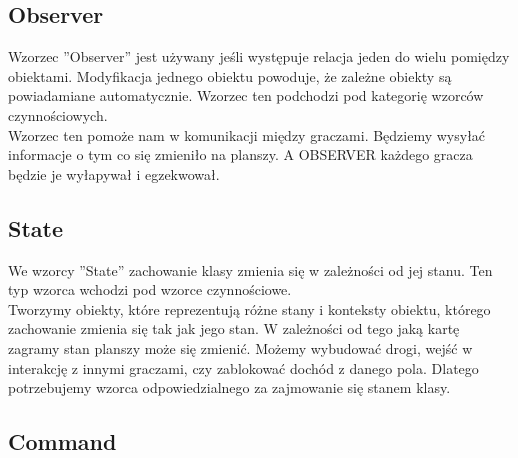 \documentclass[a4paper, 11pt]{article}
\begin{document}
	\subsection{Observer}
	Wzorzec ''Observer'' jest używany jeśli występuje relacja jeden do wielu pomiędzy obiektami. Modyfikacja jednego obiektu powoduje, że zależne obiekty są powiadamiane automatycznie. Wzorzec ten podchodzi pod kategorię wzorców czynnościowych.\\
Wzorzec ten pomoże nam w komunikacji między graczami. Będziemy wysyłać informacje o tym co się zmieniło na planszy. A OBSERVER każdego gracza będzie je wyłapywał i egzekwował.
	\subsection{State}
	\indent
We wzorcy ''State'' zachowanie klasy zmienia się w zależności od jej stanu. Ten typ wzorca wchodzi pod wzorce czynnościowe.\\
Tworzymy obiekty, które reprezentują różne stany i konteksty obiektu, którego zachowanie zmienia się tak jak jego stan.
W zależności od tego jaką kartę zagramy stan planszy może się zmienić. Możemy wybudować drogi, wejść w interakcję z innymi graczami, czy zablokować dochód z danego pola. Dlatego potrzebujemy wzorca odpowiedzialnego za zajmowanie się stanem klasy.
	\subsection{Command}
	
\end{document}
